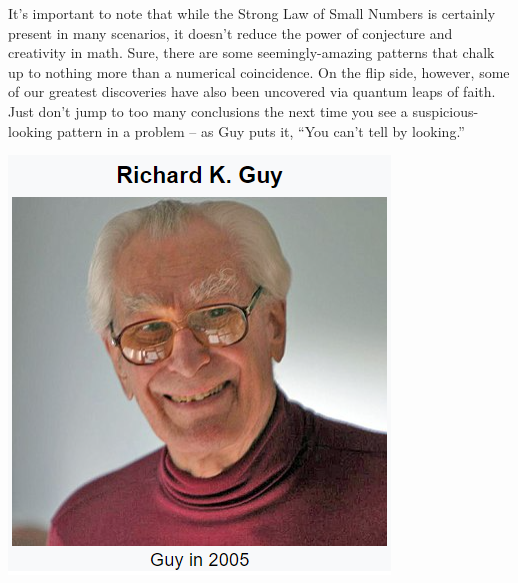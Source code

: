 \documentclass{article}
\begin{document}
It’s important to note that while the Strong Law of Small Numbers is certainly present in many scenarios, it doesn’t reduce the power of conjecture and creativity in math. Sure, there are some seemingly-amazing patterns that chalk up to nothing more than a numerical coincidence. On the flip side, however, some of our greatest discoveries have also been uncovered via quantum leaps of faith. Just don’t jump to too many conclusions the next time you see a suspicious-looking pattern in a problem – as Guy puts it, “You can’t tell by looking.” 
\begin{center}
\includegraphics[scale=0.75]{images/richard_guy.png}
\end{center}
\end{document}
